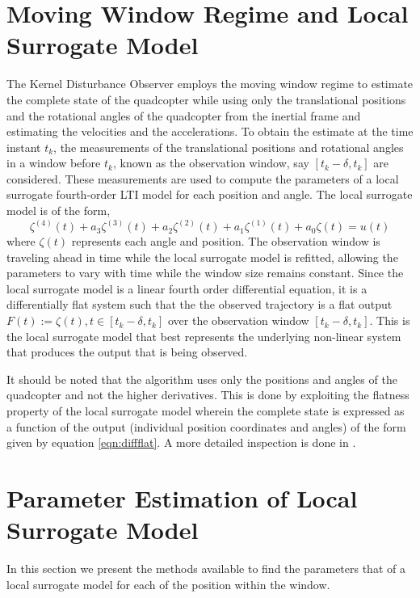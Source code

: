 \documentclass[letterpaper%
, twoside%
, 12pt%
,memoire%
, english%
,creativecommons,hyperref%
]{thETS}
\theoremstyle{newThmStyle}
\begin{document}
\section{Moving Window Regime and Local Surrogate Model} \label{Sec:MovWin}
The Kernel Disturbance Observer employs the moving window regime to estimate the complete state of the quadcopter while using only the translational positions and the rotational angles of the quadcopter from the inertial frame and estimating the velocities and the accelerations. To obtain the estimate at the time instant $t_k$, the measurements of the translational positions and rotational angles in a window before $t_k$, known as the observation window, say $[t_k-\delta, t_k]$ are considered. These measurements are used to compute the parameters of a local surrogate fourth-order LTI model for each position and angle.  The local surrogate model is of the form,
\begin{equation} \label{eqn:local}
\zeta^{(4)}(t) + a_{3}\zeta^{(3)}(t) + a_{2} \zeta^{(2)}(t) + a_{1}\zeta^{(1)}(t) + a_{0}\zeta(t) = u(t)
\end{equation}
where $\zeta(t)$ represents each angle and position. The observation window is traveling ahead in time while the local surrogate model is refitted, allowing the parameters to vary with time while the window size remains constant. Since the local surrogate model is a linear fourth order differential equation, it is a differentially flat system such that the the observed trajectory is a flat output $F(t) := \zeta(t), t \in [t_k-\delta,t_{k}]$ over the observation window $[t_k-\delta,t_k]$. This is the local surrogate model that best represents the underlying non-linear system that produces the output that is being observed.  

It should be noted that the algorithm uses only the positions and angles of the quadcopter and not the higher derivatives. This is done by exploiting the flatness property of the local surrogate model wherein the complete state is expressed as a function of the output (individual position coordinates and angles) of the form given by equation \eqref{eqn:diffflat}. A more detailed inspection is done in \citep{pandey2018variational}. 

\section{Parameter Estimation of Local Surrogate Model} \label{Sec:ParEst}
In this section we present the methods available to find the parameters that of a local surrogate model for each of the position within the window.
\end{document}
